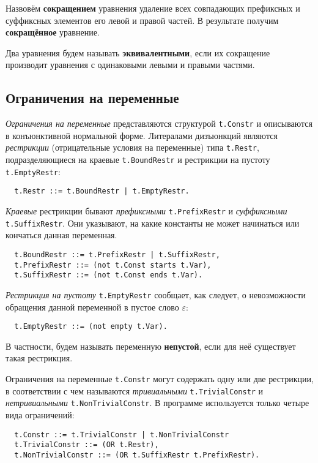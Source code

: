 \documentclass[12pt]{article}
\begin{document}
Назвовём \textbf{сокращением} уравнения удаление всех совпадающих префиксных
и суффиксных элементов его левой и правой частей. В результате получим
\textbf{сокращённое} уравнение.

Два уравнения будем называть \textbf{эквивалентными}, если их сокращение
производит уравнения с одинаковыми левыми и правыми частями.


\subsection{Ограничения на переменные}

\textit{Ограничения на переменные} представляются структурой \texttt{t.Constr}
и описываются в конъюнктивной нормальной форме. Литералами дизъюнкций являются
\textit{рестрикции} (отрицательные условия на переменные) типа \texttt{t.Restr},
подразделяющиеся на краевые \texttt{t.BoundRestr} и рестрикции на пустоту
\texttt{t.EmptyRestr}:
\begin{Verbatim}
  t.Restr ::= t.BoundRestr | t.EmptyRestr.
\end{Verbatim}

\textit{Краевые} рестрикции бывают \textit{префиксными} \texttt{t.PrefixRestr} и
\textit{суффиксными} \texttt{t.SuffixRestr}. Они указывают, на какие константы
не может начинаться или кончаться данная переменная.
\begin{Verbatim}
  t.BoundRestr ::= t.PrefixRestr | t.SuffixRestr,
  t.PrefixRestr ::= (not t.Const starts t.Var),
  t.SuffixRestr ::= (not t.Const ends t.Var).
\end{Verbatim}

\textit{Рестрикция на пустоту} \texttt{t.EmptyRestr} сообщает, как следует, о
невозможности обращения данной переменной в пустое слово $\varepsilon$:
\begin{Verbatim}
  t.EmptyRestr ::= (not empty t.Var).
\end{Verbatim}

В частности, будем называть переменную \textbf{непустой}, если для неё
существует такая рестрикция.

Ограничения на переменные \texttt{t.Constr} могут содержать одну или две
рестрикции, в соответствии с чем называются \textit{тривиальными}
\texttt{t.TrivialConstr} и \textit{нетривиальными} \texttt{t.NonTrivialConstr}.
В программе используется только четыре вида ограничений:
\begin{Verbatim}
  t.Constr ::= t.TrivialConstr | t.NonTrivialConstr
  t.TrivialConstr ::= (OR t.Restr),
  t.NonTrivialConstr ::= (OR t.SuffixRestr t.PrefixRestr).
\end{Verbatim}
\end{document}
